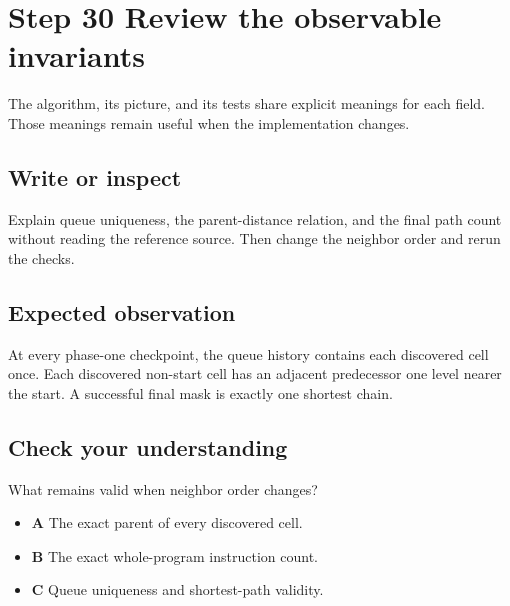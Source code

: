 \section{Step 30 Review the observable invariants}\label{maze-s30}

The algorithm, its picture, and its tests share explicit meanings for each field. Those meanings remain useful when the implementation changes.

\subsection{Write or inspect}

Explain queue uniqueness, the parent-distance relation, and the final path count without reading the reference source. Then change the neighbor order and rerun the checks.

\subsection{Expected observation}

At every phase-one checkpoint, the queue history contains each discovered cell once. Each discovered non-start cell has an adjacent predecessor one level nearer the start. A successful final mask is exactly one shortest chain.

\subsection{Check your understanding}

What remains valid when neighbor order changes?

\begin{itemize}
  \item \textbf{A} The exact parent of every discovered cell.
  \item \textbf{B} The exact whole-program instruction count.
  \item \textbf{C} Queue uniqueness and shortest-path validity.
\end{itemize}
